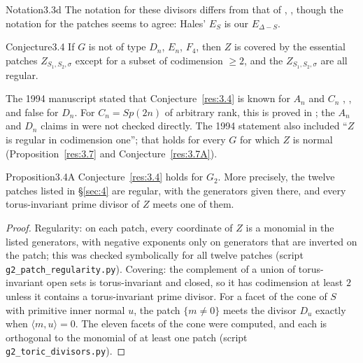 \documentclass[12pt,letterpaper]{amsart}
\theoremstyle{plain}
\theoremstyle{definition}
\theoremstyle{remark}
\theoremstyle{definition}
\begin{document}
\begin{resdef}{Notation}{3.3d}\label{res:notation}
The notation for these divisors differs from that of \cite{Ha92a},
\cite{Ha89}, though the notation for the patches seems to agree:
Hales' $E_S$ is our $E_{\Delta -S}$.
\end{resdef}

\begin{res}{Conjecture}{3.4}\label{res:3.4}
If $G$ is not of type $D_n$, $E_n$, $F_4$, then
$Z$ is covered by the essential patches $Z_{S_1,S_2,\sigma}$ except for
a subset of codimension $\geq 2$, and the $Z_{S_1,S_2,\sigma}$
are all regular.
\end{res}

\begin{rem26}\label{rem:3.4}
The 1994 manuscript stated that Conjecture~\ref{res:3.4} is known for
$A_n$ and $C_n$ \cite{Ha92a}, \cite{Ha89}, and false for $D_n$. For $C_n=Sp(2n)$
of arbitrary rank, this is proved in \cite[\S4, Lemma~4.2, pp.~212--217]{Ha89};
the $A_n$ and $D_n$ claims in \cite{Ha92a} were not checked directly. The 1994
statement also included ``$Z$ is regular in codimension one''; that holds for
every $G$ for which $Z$ is normal (Proposition~\ref{res:3.7} and
Conjecture~\ref{res:3.7A}).
\end{rem26}

\begin{res}{Proposition}{3.4A}\label{res:3.4A}
Conjecture~\ref{res:3.4} holds for $G_2$. More precisely, the twelve patches
listed in \S\ref{sec:4} are regular, with the generators given there, and
every torus-invariant prime divisor of $Z$ meets one of them.
\end{res}

\begin{proof}
Regularity: on each patch, every coordinate of $Z$ is a monomial in the
listed generators, with negative exponents only on generators that are
inverted on the patch; this was checked symbolically for all twelve patches
(script \texttt{g2\_patch\_regularity.py}). Covering: the complement of a
union of torus-invariant open sets is torus-invariant and closed, so it has
codimension at least $2$ unless it contains a torus-invariant prime divisor.
For a facet of the cone of $S$ with primitive inner normal $u$, the patch
$\{m\neq0\}$ meets the divisor $D_u$ exactly when $\langle m,u\rangle=0$.
The eleven facets of the cone were computed, and each is orthogonal to the
monomial of at least one patch (script \texttt{g2\_toric\_divisors.py}).
\end{proof}
\end{document}
